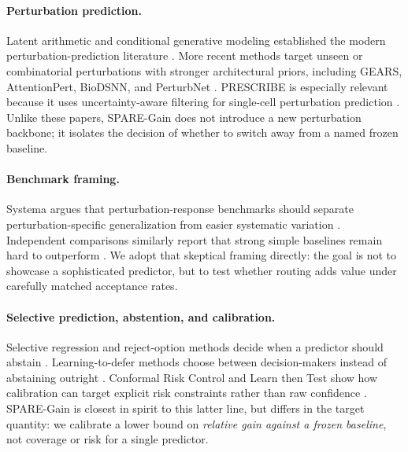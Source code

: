 \documentclass{article}
\begin{document}
\paragraph{Perturbation prediction.}
Latent arithmetic and conditional generative modeling established the modern perturbation-prediction literature \citep{lotfollahi2019scgen,lotfollahi2023cpa}. More recent methods target unseen or combinatorial perturbations with stronger architectural priors, including GEARS, AttentionPert, BioDSNN, and PerturbNet \citep{roohani2024gears,bai2024attentionpert,tan2024biodsnn,yu2025perturbnet}. PRESCRIBE is especially relevant because it uses uncertainty-aware filtering for single-cell perturbation prediction \citep{cheng2025prescribe}. Unlike these papers, SPARE-Gain does not introduce a new perturbation backbone; it isolates the decision of whether to switch away from a named frozen baseline.

\paragraph{Benchmark framing.}
Systema argues that perturbation-response benchmarks should separate perturbation-specific generalization from easier systematic variation \citep{vinastorne2025systema}. Independent comparisons similarly report that strong simple baselines remain hard to outperform \citep{ahlmanneltze2025linearbaseline,kernfeld2025forecasting}. We adopt that skeptical framing directly: the goal is not to showcase a sophisticated predictor, but to test whether routing adds value under carefully matched acceptance rates.

\paragraph{Selective prediction, abstention, and calibration.}
Selective regression and reject-option methods decide when a predictor should abstain \citep{geifman2019selectivenet,denis2020regression,sokol2024conformalized}. Learning-to-defer methods choose between decision-makers instead of abstaining outright \citep{mozannar2020consistent}. Conformal Risk Control and Learn then Test show how calibration can target explicit risk constraints rather than raw confidence \citep{angelopoulos2024conformal,angelopoulos2022learn}. SPARE-Gain is closest in spirit to this latter line, but differs in the target quantity: we calibrate a lower bound on \emph{relative gain against a frozen baseline}, not coverage or risk for a single predictor.
\end{document}
